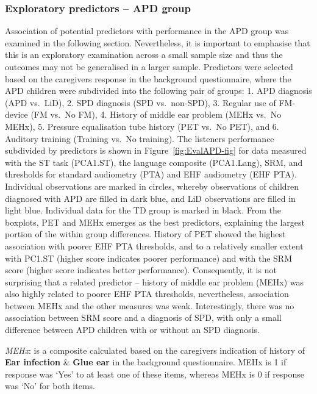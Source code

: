 \documentclass[a4paper, twoside]{templates/ociamthesis}
\begin{document}
\hypertarget{exploratory-predictors-apd-group}{%
\subsubsection{Exploratory predictors -- APD group}\label{exploratory-predictors-apd-group}}

Association of potential predictors with performance in the APD group was examined in the following section. Nevertheless, it is important to emphasise that this is an exploratory examination across a small sample size and thus the outcomes may not be generalised in a larger sample. Predictors were selected based on the caregivers response in the background questionnaire, where the APD children were subdivided into the following pair of groups: 1. APD diagnosis (APD vs.~LiD), 2. SPD diagnosis (SPD vs.~non-SPD), 3. Regular use of FM-device (FM vs.~No FM), 4. History of middle ear problem (MEHx vs.~No MEHx), 5. Pressure equalisation tube history (PET vs.~No PET), and 6. Auditory training (Training vs.~No training). The listeners performance subdivided by predictors is shown in Figure~\ref{fig:EvalAPD-fig} for data measured with the ST task (PCA1.ST), the language composite (PCA1.Lang), SRM, and thresholds for standard audiometry (PTA) and EHF audiometry (EHF PTA). Individual observations are marked in circles, whereby observations of children diagnosed with APD are filled in dark blue, and LiD observations are filled in light blue. Individual data for the TD group is marked in black. From the boxplots, PET and MEHx emerges as the best predictors, explaining the largest portion of the within group differences. History of PET showed the highest association with poorer EHF PTA thresholds, and to a relatively smaller extent with PC1.ST (higher score indicates poorer performance) and with the SRM score (higher score indicates better performance). Consequently, it is not surprising that a related predictor -- history of middle ear problem (MEHx) was also highly related to poorer EHF PTA thresholds, nevertheless, association between MEHx and the other measures was weak. Interestingly, there was no association between SRM score and a diagnosis of SPD, with only a small difference between APD children with or without an SPD diagnosis.\\

\begin{correction}
\emph{MEHx}: is a composite calculated based on the caregivers
indication of history of \textbf{Ear infection} \& \textbf{Glue ear} in
the background questionnaire. MEHx is 1 if response was `Yes' to at
least one of these items, whereas MEHx is 0 if response was `No' for
both items.
\end{correction}
\end{document}
